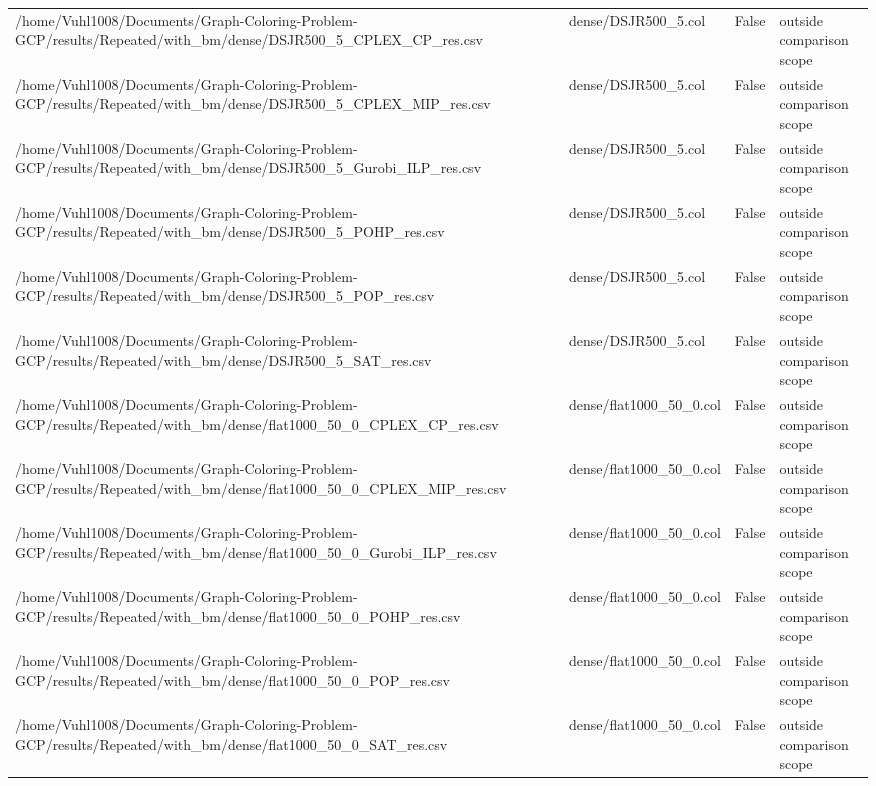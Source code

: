 \begin{table}[htbp]
\begin{tabular}{llll}
/home/Vuhl1008/Documents/Graph-Coloring-Problem-GCP/results/Repeated/with\_bm/dense/DSJR500\_5\_CPLEX\_CP\_res.csv & dense/DSJR500\_5.col & False & outside comparison scope \\
/home/Vuhl1008/Documents/Graph-Coloring-Problem-GCP/results/Repeated/with\_bm/dense/DSJR500\_5\_CPLEX\_MIP\_res.csv & dense/DSJR500\_5.col & False & outside comparison scope \\
/home/Vuhl1008/Documents/Graph-Coloring-Problem-GCP/results/Repeated/with\_bm/dense/DSJR500\_5\_Gurobi\_ILP\_res.csv & dense/DSJR500\_5.col & False & outside comparison scope \\
/home/Vuhl1008/Documents/Graph-Coloring-Problem-GCP/results/Repeated/with\_bm/dense/DSJR500\_5\_POHP\_res.csv & dense/DSJR500\_5.col & False & outside comparison scope \\
/home/Vuhl1008/Documents/Graph-Coloring-Problem-GCP/results/Repeated/with\_bm/dense/DSJR500\_5\_POP\_res.csv & dense/DSJR500\_5.col & False & outside comparison scope \\
/home/Vuhl1008/Documents/Graph-Coloring-Problem-GCP/results/Repeated/with\_bm/dense/DSJR500\_5\_SAT\_res.csv & dense/DSJR500\_5.col & False & outside comparison scope \\
/home/Vuhl1008/Documents/Graph-Coloring-Problem-GCP/results/Repeated/with\_bm/dense/flat1000\_50\_0\_CPLEX\_CP\_res.csv & dense/flat1000\_50\_0.col & False & outside comparison scope \\
/home/Vuhl1008/Documents/Graph-Coloring-Problem-GCP/results/Repeated/with\_bm/dense/flat1000\_50\_0\_CPLEX\_MIP\_res.csv & dense/flat1000\_50\_0.col & False & outside comparison scope \\
/home/Vuhl1008/Documents/Graph-Coloring-Problem-GCP/results/Repeated/with\_bm/dense/flat1000\_50\_0\_Gurobi\_ILP\_res.csv & dense/flat1000\_50\_0.col & False & outside comparison scope \\
/home/Vuhl1008/Documents/Graph-Coloring-Problem-GCP/results/Repeated/with\_bm/dense/flat1000\_50\_0\_POHP\_res.csv & dense/flat1000\_50\_0.col & False & outside comparison scope \\
/home/Vuhl1008/Documents/Graph-Coloring-Problem-GCP/results/Repeated/with\_bm/dense/flat1000\_50\_0\_POP\_res.csv & dense/flat1000\_50\_0.col & False & outside comparison scope \\
/home/Vuhl1008/Documents/Graph-Coloring-Problem-GCP/results/Repeated/with\_bm/dense/flat1000\_50\_0\_SAT\_res.csv & dense/flat1000\_50\_0.col & False & outside comparison scope \\

\end{tabular}
\end{table}
